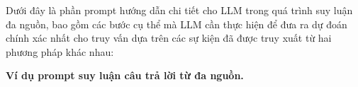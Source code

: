 

Dưới đây là phần prompt hướng dẫn chi tiết cho LLM trong quá trình suy luận đa nguồn, bao gồm các bước cụ thể mà LLM cần thực hiện để đưa ra dự đoán chính xác nhất cho truy vấn dựa trên các sự kiện đã được truy xuất từ hai phương pháp khác nhau:

\noindent\textbf{Ví dụ prompt suy luận câu trả lời từ đa nguồn.}

